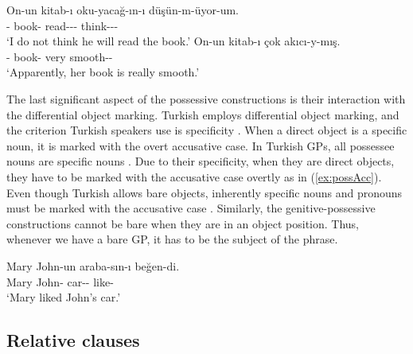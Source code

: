 \ea \label{ex:difParses}
  \ea \label{ex:accParse}
    \gll On-un kitab{-{\i}} oku-yaca\u{g}-{\i}n-{\i} d{\"u}\c{s}{\"u}n-m-{\"u}yor-um.\\
    \Tsg{}-\Gen{} book{-\Acc{}} read-\Fut{}-\Poss{}-\Acc{} think-\Neg{}-\Impf{}-\Fsg{}\\
    \glt `I do not think he will read the book.'
  \ex \label{ex:possParse}
    \gll On-un kitab{-{\i}} \c{c}ok ak{\i}c{\i}-y-m{\i}\c{s}.\\
    \Tsg{}-\Gen{} book{-\Poss{}} very smooth-\Cop{}-\Evid{}\\
    \glt `Apparently, her book is really smooth.'
  \z
\z

The last significant aspect of the possessive constructions is their interaction with the differential object marking. Turkish employs differential object marking, and the criterion Turkish speakers use is specificity \citep{Enc1991,HeusingerBamyaci2017,HeusingerKornfilt2005}. When a direct object is a specific noun, it is marked with the overt accusative case. In Turkish GPs, all possessee nouns are specific nouns . Due to their specificity, when they are direct objects, they have to be marked with the accusative case overtly as in (\ref{ex:possAcc}). Even though Turkish allows bare objects, inherently specific nouns and pronouns must be marked with the accusative case \citep{Kelepir2001}. Similarly, the genitive-possessive constructions cannot be bare when they are in an object position. Thus, whenever we have a bare GP, it has to be the subject of the phrase. 

\ea \label{ex:possAcc}
  \ea \label{ex:possAccGrammatical}
    \gll Mary John-un araba-s{\i}n-{\i} be\u{g}en-di.\\
    Mary John-\Gen{} car-\Poss{}-\Acc{} like-\Pst{}\\
    \glt `Mary liked John's car.'
  \z
\z


\subsection{Relative clauses}

